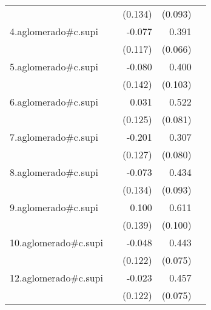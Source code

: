 {\begin{longtable}{l*{4}{D{.}{.}{-1}}}
            &                     &     (0.134)         &     (0.093)         &                     \\
\addlinespace
4.aglomerado#c.supi&                     &      -0.077         &       0.391\sym{***}&                     \\
            &                     &     (0.117)         &     (0.066)         &                     \\
\addlinespace
5.aglomerado#c.supi&                     &      -0.080         &       0.400\sym{***}&                     \\
            &                     &     (0.142)         &     (0.103)         &                     \\
\addlinespace
6.aglomerado#c.supi&                     &       0.031         &       0.522\sym{***}&                     \\
            &                     &     (0.125)         &     (0.081)         &                     \\
\addlinespace
7.aglomerado#c.supi&                     &      -0.201         &       0.307\sym{***}&                     \\
            &                     &     (0.127)         &     (0.080)         &                     \\
\addlinespace
8.aglomerado#c.supi&                     &      -0.073         &       0.434\sym{***}&                     \\
            &                     &     (0.134)         &     (0.093)         &                     \\
\addlinespace
9.aglomerado#c.supi&                     &       0.100         &       0.611\sym{***}&                     \\
            &                     &     (0.139)         &     (0.100)         &                     \\
\addlinespace
10.aglomerado#c.supi&                     &      -0.048         &       0.443\sym{***}&                     \\
            &                     &     (0.122)         &     (0.075)         &                     \\
\addlinespace
12.aglomerado#c.supi&                     &      -0.023         &       0.457\sym{***}&                     \\
            &                     &     (0.122)         &     (0.075)         &                     \\

\end{longtable}}
